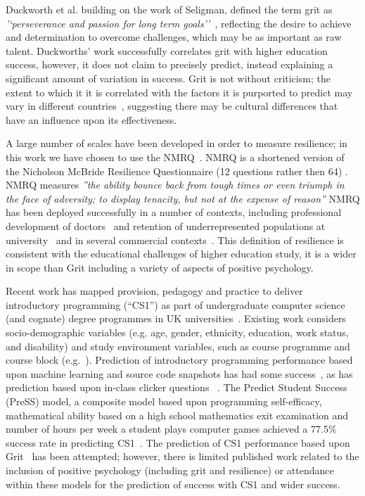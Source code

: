 \documentclass[sigconf]{acmart}
\begin{document}
Duckworth et al. building on the work of Seligman, defined the term grit as {\em'`perseverance and passion for long term goals''~\cite[p.~1087]{Duckworth2007}}, reflecting the desire to achieve and determination to overcome challenges, which may be as important as raw talent. Duckworths' work successfully correlates grit with higher education success, however, it does not claim to precisely predict, instead explaining a significant amount of variation in success. Grit is not without criticism; the extent to which it it is correlated with the factors it is purported to predict may vary in different countries~\cite{Datu2016, Tyumeneva2017}, suggesting there may be cultural differences that have an influence upon its effectiveness. 

A large number of scales have been developed in order to measure resilience; in this work we have chosen to use the NMRQ~\cite{Clarke2010}. NMRQ is a shortened version of the Nicholson McBride Resilience Questionnaire (12 questions rather then 64) \cite{Clarke2010}. NMRQ measures {\em''the ability bounce back from tough times or even triumph in the face of adversity; to display tenacity, but not at the expense of reason''\cite[p.~1]{Clarke2010}} NMRQ has been deployed successfully in a number of contexts, including professional development of doctors~\cite{Tregoningg251} and retention of underrepresented populations at university~\cite{Daniels2015} and in several commercial contexts~\cite{Clarke2010}. This definition of resilience is consistent with the educational challenges of higher education study, it is a wider in scope than Grit including a variety of aspects of positive psychology.

Recent work has mapped provision, pedagogy and practice to deliver introductory programming (``CS1'') as part of undergraduate computer science (and cognate) degree programmes in UK universities~\cite{davenport-et-al:latice2016,murphy-et-al:programming2017,simon-et-al:sigcse2018}. Existing work considers socio-demographic variables (e.g. age, gender, ethnicity, education, work status, and disability) and study environment variables, such as course programme and course block (e.g.~\cite{Liao:2019:RML:3308443.3277569}). Prediction of introductory programming performance based upon machine learning and source code snapshots has had some success~\cite{Ahadi:2015:EML:2787622.2787717,Castro-Wunsch:2017:ENN:3017680.3017792}, as has prediction based upon in-class clicker questions ~\cite{Liao:2019:RML:3308443.3277569}. The Predict Student Success (PreSS) model, a composite model based upon programming self-efficacy, mathematical ability based on a high school mathematics exit examination and number of hours per week a student plays computer games achieved a 77.5\% success rate in predicting CS1~\cite{Quille:2018:PPS:3197091.3197101}. The prediction of CS1 performance based upon Grit~\cite{Sigurdson:2018:EGC:3279720.3279743} has been attempted; however, there is limited published work related to the inclusion of positive psychology (including grit and resilience) or attendance within these models for the prediction of success with CS1 and wider success.
\end{document}
